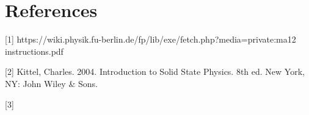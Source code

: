 \documentclass{article}
\begin{document}
\section*{References}

[1] https://wiki.physik.fu-berlin.de/fp/lib/exe/fetch.php?media=private:ma12 instructions.pdf

[2] Kittel, Charles. 2004. Introduction to Solid State Physics. 8th ed. New York, NY: John Wiley & Sons.

[3] 
\end{document}
